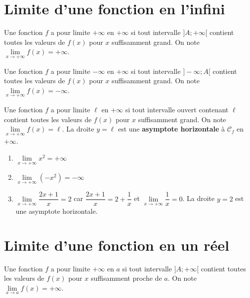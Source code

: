 \documentclass[11pt,a4paper,openany]{book}
\theoremstyle{definition}
\begin{document}
    \section{Limite d'une fonction en l'infini}
    \begin{Définition}
        Une fonction $f$ a pour limite $+\infty$ en $+\infty$ si tout intervalle $]A;+\infty[$
        contient toutes les valeurs de $f(x)$ pour $x$ suffisamment grand.
        On note $\lim\limits_{x\to+\infty}f(x)=+\infty$.
    \end{Définition}

    \begin{Définition}
        Une fonction $f$ a pour limite $-\infty$ en $+\infty$ si tout intervalle $]-\infty;A[$
        contient toutes les valeurs de $f(x)$ pour $x$ suffisamment grand.
        On note $\lim\limits_{x\to+\infty}f(x)=-\infty$.
    \end{Définition}

    \begin{Définition}
        Une fonction $f$ a pour limite $\ell$ en $+\infty$ si tout intervalle ouvert contenant
        $\ell$ contient toutes les valeurs de $f(x)$ pour $x$ suffisamment grand.
        On note $\lim\limits_{x\to+\infty}f(x)=\ell$.
        La droite $y=\ell$ est une \textbf{asymptote horizontale} à $\mathcal{C}_f$ en $+\infty$.
    \end{Définition}

    \begin{Exemple}
        \begin{enumerate}
            \item $\lim\limits_{x\to+\infty}x^2=+\infty$
            \item $\lim\limits_{x\to+\infty}(-x^2)=-\infty$
            \item $\lim\limits_{x\to+\infty}\dfrac{2x+1}{x}=2$ car
                  $\dfrac{2x+1}{x}=2+\dfrac{1}{x}$ et $\lim\limits_{x\to+\infty}\dfrac{1}{x}=0$.
                  La droite $y=2$ est une asymptote horizontale.
        \end{enumerate}
    \end{Exemple}

    \section{Limite d'une fonction en un réel}
    \begin{Définition}
        Une fonction $f$ a pour limite $+\infty$ en $a$ si tout intervalle $]A;+\infty[$
        contient toutes les valeurs de $f(x)$ pour $x$ suffisamment proche de $a$.
        On note $\lim\limits_{x\to a}f(x)=+\infty$.
    \end{Définition}
\end{document}
